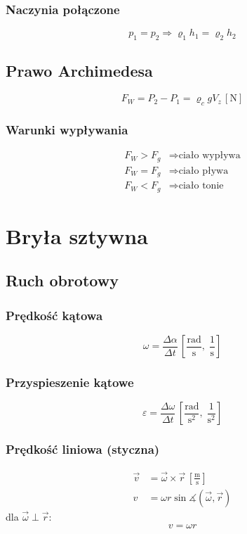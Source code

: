 \documentclass{article}
\numberwithin{equation}{section}
\newcommand{\unit}[1]{\, \left[\mathrm{#1}\right]}
\begin{document}
      \subsubsection{Naczynia połączone}
        \begin{equation}
          p_1 = p_2 \Rightarrow \varrho_1h_1 = \varrho_2h_2
        \end{equation}
    \subsection{Prawo Archimedesa}
      \begin{equation}
        F_W = P_2 - P_1 = \varrho_cgV_z \unit{N}
      \end{equation}
      \subsubsection{Warunki wypływania}
        \begin{align*}
          F_W > F_g &\Rightarrow \text{ciało wypływa}\\
          F_W = F_g &\Rightarrow \text{ciało pływa}\\
          F_W < F_g &\Rightarrow \text{ciało tonie}
        \end{align*}

  \newpage
  \section{Bryła sztywna}
    \subsection{Ruch obrotowy}
      \subsubsection{Prędkość kątowa}
        \begin{equation}
          \omega = \frac{\Delta\alpha}{\Delta t} \unit{\frac{rad}{s},\;\frac{1}{s}}
        \end{equation}
      \subsubsection{Przyspieszenie kątowe}
        \begin{equation}
          \varepsilon = \frac{\Delta\omega}{\Delta t} \unit{\frac{rad}{s^2},\;\frac{1}{s^2}}
        \end{equation}
      \subsubsection{Prędkość liniowa (styczna)}
        \begin{align}
          \vec v &= \vec\omega \times \vec r\unit{\frac{m}{s}}\\
          v &= \omega r\sin\measuredangle\left(\vec\omega, \vec r\right)
        \end{align}
        dla $\vec\omega \perp \vec r$:
        \begin{equation}
          v =\omega r
        \end{equation}
\end{document}
